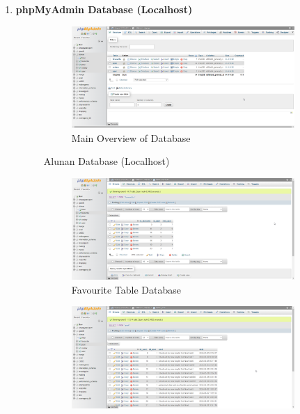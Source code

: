 \begin{enumerate}[1.]
    \item \textbf{phpMyAdmin Database (Localhost)}
    \begin{figure}[h]
        \centering
        \begin{subfigure}[b]{1.0\textwidth}
            \centering
            \includegraphics[width=\textwidth]{mainmatter/images/backend/localall.png}
            \caption{Main Overview of Database}
            \label{fig:sub1}
        \end{subfigure}
        \caption{Alunan Database (Localhost)}
        \label{fig:myfig73a}
    \end{figure}
    \clearpage
    \begin{figure}[h]
        \centering
        \begin{subfigure}[b]{1.0\textwidth}
            \centering
            \includegraphics[width=\textwidth]{mainmatter/images/backend/localfav.png}
            \caption{Favourite Table Database}
            \vspace{0.8cm}
            \label{fig:sub2}
        \end{subfigure}
        \hspace{0.08\textwidth}
        \begin{subfigure}[b]{1.0\textwidth}
            \centering
            \includegraphics[width=\textwidth]{mainmatter/images/backend/localpost.png}

\end{subfigure}
\end{figure}
\end{enumerate}
